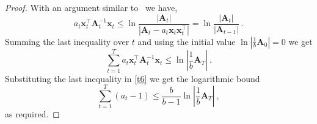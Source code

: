 \begin{proof}
With an argument similar to~\cite{Forster} we have,
 \[
 a_{t}\mathbf{x}_{t}^{\top}\mathbf{A}_{t}^{-1}\mathbf{x}_{t}
\leq\ln\frac{\left|\mathbf{A}_{t}\right|}{\left|\mathbf{A}_{t}-a_{t}\mathbf{x}_{t}\mathbf{x}_{t}^{\top}\right|}
=\ln\frac{\left|\mathbf{A}_{t}\right|}{\left|\mathbf{A}_{t-1}\right|} ~.
 \]
%
Summing the last inequality over $t$ and using the initial value
$\ln\left|\frac{1}{b}\mathbf{A}_{0}\right|=0$ we get
\[
\sum_{t=1}^{T}a_{t}\mathbf{x}_{t}^{\top}\mathbf{A}_{t}^{-1}\mathbf{x}_{t}\leq\ln\left|\frac{1}{b}\mathbf{A}_{T}\right|~.
\]
Substituting the last inequality in
\eqref{t6} we get the logarithmic bound
\[
\sum_{t=1}^{T}\left(a_{t}-1\right)\leq\frac{b}{b-1}\ln\left|\frac{1}{b}\mathbf{A}_{T}\right| ~,
\]
as required.
\QED
\end{proof}
